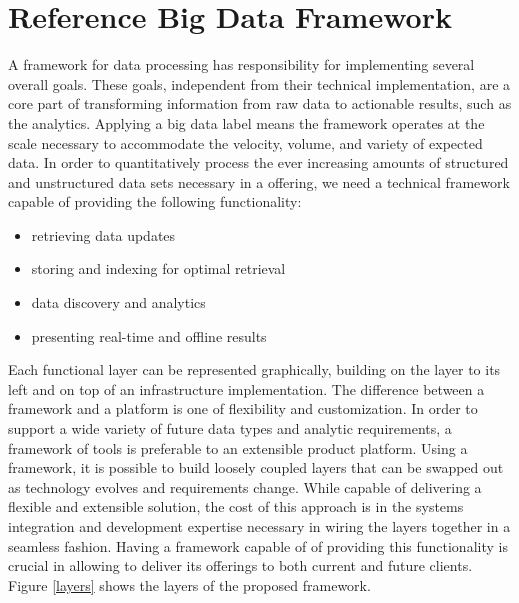 \section{Reference Big Data Framework}
A framework for data processing has responsibility for implementing several overall goals. These goals, independent from their technical implementation, are a core part of transforming information from raw data to actionable results, such as the \climatedge analytics. Applying a big data label means the framework operates at the scale necessary to accommodate the velocity, volume, and variety of expected data. In order to quantitatively process the ever increasing amounts of structured and unstructured data sets necessary in a \climatedge offering, we need a technical framework capable of providing the following functionality:
\begin{itemize}
	\item retrieving data updates
	\item storing and indexing for optimal retrieval
	\item data discovery and analytics
	\item presenting real-time and offline results
\end{itemize}
Each functional layer can be represented graphically, building on the layer to its left and on top of an infrastructure implementation. The difference between a framework and a platform is one of flexibility and customization.  In order to support a wide variety of future data types and analytic requirements, a framework of tools is preferable to an extensible product platform. Using a framework, it is possible to build loosely coupled layers that can be swapped out as technology evolves and requirements change. While capable of delivering a flexible and extensible solution, the cost of this approach is in the systems integration and development expertise necessary in wiring the layers together in a seamless fashion. Having a framework capable of of providing this functionality is crucial in allowing \climatedge to deliver its offerings to both current and future clients. Figure \ref{layers} shows the layers of the proposed framework.
